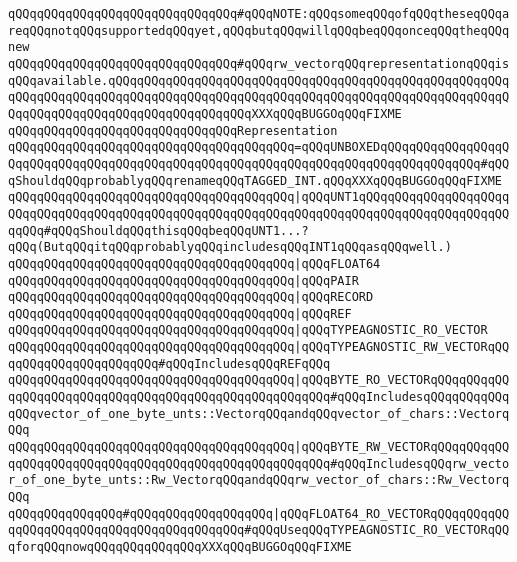 \verb|qQQqqQQqqQQqqQQqqQQqqQQqqQQqqQQq#qQQqNOTE:qQQqsomeqQQqofqQQqtheseqQQqareqQQqnotqQQqsupportedqQQqyet,qQQqbutqQQqwillqQQqbeqQQqonceqQQqtheqQQqnew|\newline
\verb|qQQqqQQqqQQqqQQqqQQqqQQqqQQqqQQq#qQQqrw_vectorqQQqrepresentationqQQqisqQQqavailable.qQQqqQQqqQQqqQQqqQQqqQQqqQQqqQQqqQQqqQQqqQQqqQQqqQQqqQQqqQQqqQQqqQQqqQQqqQQqqQQqqQQqqQQqqQQqqQQqqQQqqQQqqQQqqQQqqQQqqQQqqQQqqQQqqQQqqQQqqQQqqQQqqQQqqQQqqQQqqQQqXXXqQQqBUGGOqQQqFIXME|\newline
\newline
\verb|qQQqqQQqqQQqqQQqqQQqqQQqqQQqqQQqRepresentation|\newline
\verb|qQQqqQQqqQQqqQQqqQQqqQQqqQQqqQQqqQQqqQQq=qQQqUNBOXEDqQQqqQQqqQQqqQQqqQQqqQQqqQQqqQQqqQQqqQQqqQQqqQQqqQQqqQQqqQQqqQQqqQQqqQQqqQQqqQQqqQQq#qQQqShouldqQQqprobablyqQQqrenameqQQqTAGGED_INT.qQQqXXXqQQqBUGGOqQQqFIXME|\newline
\verb|qQQqqQQqqQQqqQQqqQQqqQQqqQQqqQQqqQQqqQQq|\verb#|qQQqUNT1qQQqqQQqqQQqqQQqqQQqqQQqqQQqqQQqqQQqqQQqqQQqqQQqqQQqqQQqqQQqqQQqqQQqqQQqqQQqqQQqqQQqqQQqqQQqqQQq#\verb|#qQQqShouldqQQqthisqQQqbeqQQqUNT1...?qQQq(ButqQQqitqQQqprobablyqQQqincludesqQQqINT1qQQqasqQQqwell.)|\newline
\verb|qQQqqQQqqQQqqQQqqQQqqQQqqQQqqQQqqQQqqQQq|\verb#|qQQqFLOAT64#\newline
\verb|qQQqqQQqqQQqqQQqqQQqqQQqqQQqqQQqqQQqqQQq|\verb#|qQQqPAIR#\newline
\verb|qQQqqQQqqQQqqQQqqQQqqQQqqQQqqQQqqQQqqQQq|\verb#|qQQqRECORD#\newline
\verb|qQQqqQQqqQQqqQQqqQQqqQQqqQQqqQQqqQQqqQQq|\verb#|qQQqREF#\newline
\verb|qQQqqQQqqQQqqQQqqQQqqQQqqQQqqQQqqQQqqQQq|\verb#|qQQqTYPEAGNOSTIC_RO_VECTOR#\newline
\verb|qQQqqQQqqQQqqQQqqQQqqQQqqQQqqQQqqQQqqQQq|\verb#|qQQqTYPEAGNOSTIC_RW_VECTORqQQqqQQqqQQqqQQqqQQqqQQq#\verb|#qQQqIncludesqQQqREFqQQq|\newline
\verb|qQQqqQQqqQQqqQQqqQQqqQQqqQQqqQQqqQQqqQQq|\verb#|qQQqBYTE_RO_VECTORqQQqqQQqqQQqqQQqqQQqqQQqqQQqqQQqqQQqqQQqqQQqqQQqqQQqqQQq#\verb|#qQQqIncludesqQQqqQQqqQQqqQQqvector_of_one_byte_unts::VectorqQQqandqQQqvector_of_chars::VectorqQQq|\newline
\verb|qQQqqQQqqQQqqQQqqQQqqQQqqQQqqQQqqQQqqQQq|\verb#|qQQqBYTE_RW_VECTORqQQqqQQqqQQqqQQqqQQqqQQqqQQqqQQqqQQqqQQqqQQqqQQqqQQqqQQq#\verb|#qQQqIncludesqQQqrw_vector_of_one_byte_unts::Rw_VectorqQQqandqQQqrw_vector_of_chars::Rw_VectorqQQq|\newline
\verb|qQQqqQQqqQQqqQQq#qQQqqQQqqQQqqQQqqQQq|\verb#|qQQqFLOAT64_RO_VECTORqQQqqQQqqQQqqQQqqQQqqQQqqQQqqQQqqQQqqQQqqQQq#\verb|#qQQqUseqQQqTYPEAGNOSTIC_RO_VECTORqQQqforqQQqnowqQQqqQQqqQQqqQQqXXXqQQqBUGGOqQQqFIXME|\newline
